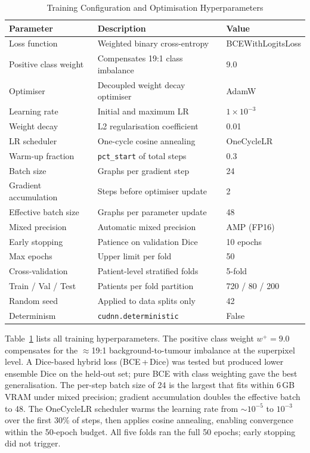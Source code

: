 \documentclass{article}
\begin{document}
\begin{table}[htbp]
\caption{Training Configuration and Optimisation Hyperparameters}
\label{tab:training}
\begin{center}
\begin{tabularx}{0.85\textwidth}{|l|X|l|}
\hline
\textbf{Parameter} & \textbf{Description} & \textbf{Value} \\
\hline
Loss function & Weighted binary cross-entropy & BCEWithLogitsLoss \\
\hline
Positive class weight & Compensates 19:1 class imbalance & 9.0 \\
\hline
Optimiser & Decoupled weight decay optimiser & AdamW \cite{loshchilov2019adamw} \\
\hline
Learning rate & Initial and maximum LR & $1 \times 10^{-3}$ \\
\hline
Weight decay & L2 regularisation coefficient & 0.01 \\
\hline
LR scheduler & One-cycle cosine annealing & OneCycleLR \\
\hline
Warm-up fraction & \texttt{pct\_start} of total steps & 0.3 \\
\hline
Batch size & Graphs per gradient step & 24 \\
\hline
Gradient accumulation & Steps before optimiser update & 2 \\
\hline
Effective batch size & Graphs per parameter update & 48 \\
\hline
Mixed precision & Automatic mixed precision & AMP (FP16) \\
\hline
Early stopping & Patience on validation Dice & 10 epochs \\
\hline
Max epochs & Upper limit per fold & 50 \\
\hline
Cross-validation & Patient-level stratified folds & 5-fold \\
\hline
Train / Val / Test & Patients per fold partition & 720 / 80 / 200 \\
\hline
Random seed & Applied to data splits only & 42 \\
\hline
Determinism & \texttt{cudnn.deterministic} & False \\
\hline
\end{tabularx}
\end{center}
\end{table}

Table~\ref{tab:training} lists all training hyperparameters. The positive class
weight $w^+ = 9.0$ compensates for the $\approx$19:1 background-to-tumour
imbalance at the superpixel level. A Dice-based hybrid loss (BCE\,+\,Dice) was
tested but produced lower ensemble Dice on the held-out set; pure BCE with class
weighting gave the best generalisation. The per-step batch size of 24 is the
largest that fits within 6\,GB VRAM under mixed precision; gradient accumulation
doubles the effective batch to 48. The OneCycleLR scheduler warms the learning
rate from $\sim$$10^{-5}$ to $10^{-3}$ over the first 30\% of steps, then
applies cosine annealing, enabling convergence within the 50-epoch budget.
All five folds ran the full 50 epochs; early stopping did not trigger.
\end{document}
